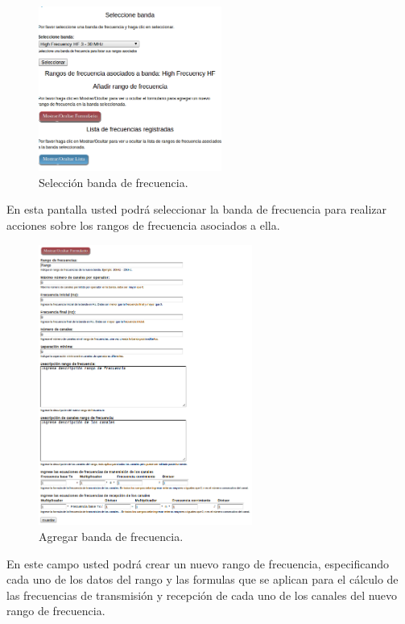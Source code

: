 \begin{multicols}{2}
\begin{figure}[H]
	\centering
	\includegraphics[width=6cm]{Anexos/Imagenes/ManualUsuario/SeleccionBanda.png}
	\caption{ Selección banda de frecuencia.}
\end{figure}

En esta pantalla usted podrá seleccionar la banda de frecuencia para realizar acciones sobre los rangos de frecuencia asociados a ella.

\begin{figure}[H]
	\centering
	\includegraphics[width=7cm]{Anexos/Imagenes/ManualUsuario/AgregarRangoFrecuencia.png}
	\caption{ Agregar banda de frecuencia.}
\end{figure}

En este campo usted podrá crear un nuevo rango de frecuencia, especificando cada uno de los datos del rango y las formulas que se aplican para el cálculo de las frecuencias de transmisión y recepción de cada uno de los canales del nuevo rango de frecuencia.


\end{multicols}
